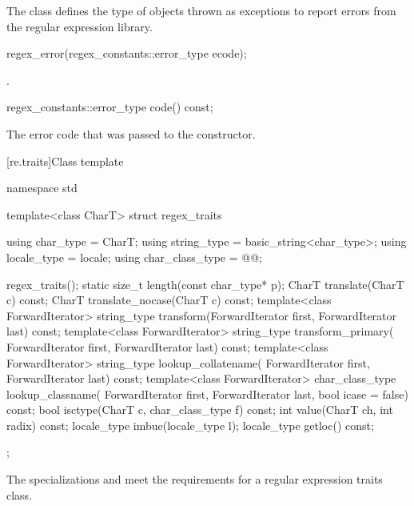 \pnum
The class  defines the type of objects thrown as
exceptions to report errors from the regular expression library.

%
\begin{itemdecl}
regex_error(regex_constants::error_type ecode);
\end{itemdecl}

\begin{itemdescr}
\pnum
\ensures
{}.
\end{itemdescr}

%
%
\begin{itemdecl}
regex_constants::error_type code() const;
\end{itemdecl}

\begin{itemdescr}
\pnum
\returns
The error code that was passed to the constructor.
\end{itemdescr}

[re.traits]{Class template }
%
\begin{codeblock}
namespace std {
  template<class CharT>
    struct regex_traits {
      using char_type       = CharT;
      using string_type     = basic_string<char_type>;
      using locale_type     = locale;
      using char_class_type = @@;

      regex_traits();
      static size_t length(const char_type* p);
      CharT translate(CharT c) const;
      CharT translate_nocase(CharT c) const;
      template<class ForwardIterator>
        string_type transform(ForwardIterator first, ForwardIterator last) const;
      template<class ForwardIterator>
        string_type transform_primary(
          ForwardIterator first, ForwardIterator last) const;
      template<class ForwardIterator>
        string_type lookup_collatename(
          ForwardIterator first, ForwardIterator last) const;
      template<class ForwardIterator>
        char_class_type lookup_classname(
          ForwardIterator first, ForwardIterator last, bool icase = false) const;
      bool isctype(CharT c, char_class_type f) const;
      int value(CharT ch, int radix) const;
      locale_type imbue(locale_type l);
      locale_type getloc() const;
    };
}
\end{codeblock}

\pnum
{}%
%
The specializations  and
 meet the
requirements for a regular expression traits class.

